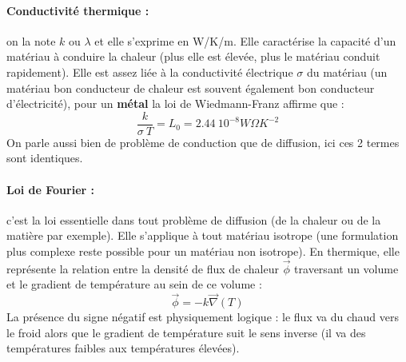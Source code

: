 
\paragraph{Conductivité thermique :}on la note $k$ ou $\lambda$ et elle s'exprime en W/K/m. Elle caractérise la capacité d'un matériau à conduire la chaleur (plus elle est élevée, plus le matériau conduit rapidement). Elle est assez liée à la conductivité électrique $\sigma$ du matériau (un matériau bon conducteur de chaleur est souvent également bon conducteur d'électricité), pour un \textbf{métal} la loi de Wiedmann-Franz affirme que :
%
\begin{equation}
    \frac{k}{\sigma~T} = L_0 = 2.44~10^{-8} W\Omega K^{-2}
\end{equation}
%
On parle aussi bien de problème de conduction que de diffusion, ici ces 2 termes sont identiques.


\paragraph{Loi de Fourier :}c'est la loi essentielle dans tout problème de diffusion (de la chaleur ou de la matière par exemple). Elle s'applique à tout matériau isotrope (une formulation plus complexe reste possible pour un matériau non isotrope). En thermique, elle représente la relation entre la densité de flux de chaleur $\vec{\phi}$ traversant un volume et le gradient de température au sein de ce volume :
%
\begin{equation}
    \vec{\phi} = - k \vec{\nabla}(T)
    \label{eq:fourier}
\end{equation}
%
La présence du signe négatif est physiquement logique : le flux va du chaud vers le froid alors que le gradient de température suit le sens inverse (il va des températures faibles aux températures élevées).
%
\begin{center}
\end{center}


